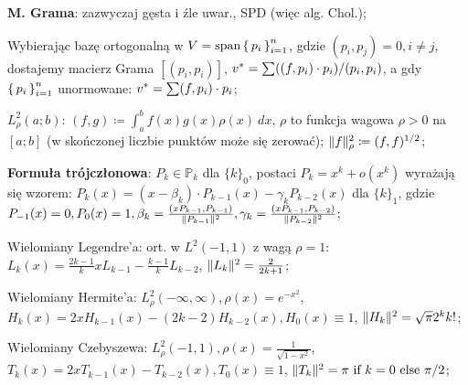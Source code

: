 \entry
\textbf{M. Grama}: zazwyczaj gęsta i źle uwar., SPD (więc alg. Chol.);

\entry
Wybierając bazę ortogonalną w $V = \text{span}\set{p_i}^n_{i=1}$,
gdzie $(p_i, p_j) = 0, i \neq j$, dostajemy macierz Grama
$[(p_i, p_i)]$,
$v^{*} = \sum((f,p_i)\cdot p_i)/(p_i, p_i)$,
a gdy $\set{p_i}^n_{i=1}$ unormowane:
$v^{*} = \sum(f,p_i)\cdot p_i$;

\entry
$L^2_\rho(a;b)$:
$(f,g) \coloneqq \int^b_a f(x)g(x)\rho(x) \ dx$,
$\rho$ to funkcja wagowa $\rho > 0$ na $[a;b]$
(w skończonej liczbie punktów może się zerować);
$\|f\|^2_\rho \coloneqq (f,f)^{1/2}$;

\entry
\textbf{Formuła trójczłonowa}:
$P_k \in \mathbb{P}_k$ dla  $\{k\}_0$, postaci
$P_k = x^k + o(x^k)$ wyrażają się wzorem:
$P_k(x) = (x - \beta_k) \cdot P_{k-1}(x) - \gamma_k P_{k-2}(x)$
dla $\{k\}_1$, gdzie
$
P_{-1}(x)=0,
P_{0}(x)=1,
\beta_k= \frac{(x P_{k-1}, P_{k-1})}{\|P_{k-1}\|^2},
\gamma_k = \frac{(x P_{k-1}, P_{k-2})}{\|P_{k-2}\|^2}
$;

\entry
Wielomiany Legendre'a:
ort. w $L^2(-1,1)$ z wagą $\rho = 1$:
$L_k(x) = \frac{2k-1}{k}xL_{k-1} - \frac{k-1}{k}L_{k-2}$,
$\|L_k\|^2=\frac{2}{2k+1}$;

\entry
Wielomiany Hermite'a:
$L^2_\rho(-\infty, \infty), \rho(x)=e^{-x^2}$,
$H_k(x) = 2xH_{k-1}(x) - (2k-2) H_{k-2}(x), H_0(x) \equiv 1$,
$\|H_k\|^2 = \sqrt{\pi}2^kk!$;

\entry
Wielomiany Czebyszewa:
$L_\rho^2(-1,1), \rho(x)=\frac{1}{\sqrt{1-x^2}}$,
$T_k(x) = 2xT_{k-1}(x) - T_{k-2}(x), T_0(x)\equiv 1$,
$\|T_k\|^2 = \pi \text{ if } k=0 \text{ else } \pi/2$;
